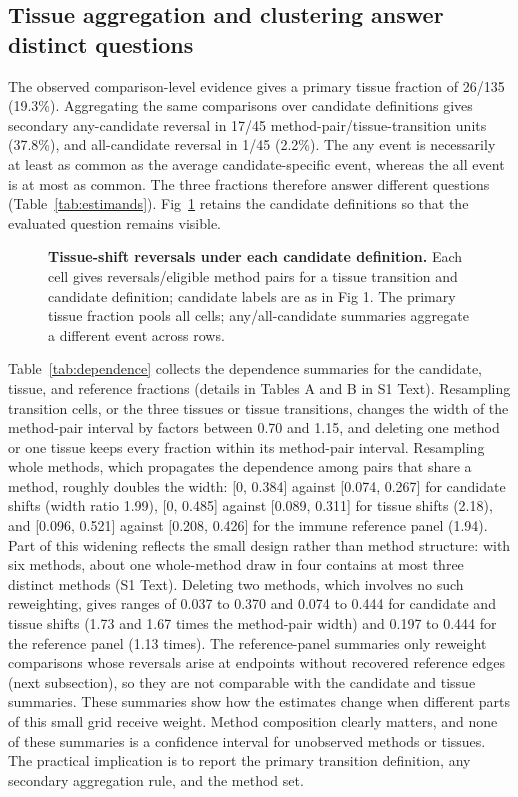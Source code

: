 \documentclass[10pt,letterpaper]{article}
\begin{document}
\subsection*{Tissue aggregation and clustering answer distinct questions}
The observed comparison-level evidence gives a primary tissue fraction of 26/135 (19.3\%). Aggregating the same comparisons over candidate definitions gives secondary any-candidate reversal in 17/45 method-pair/tissue-transition units (37.8\%), and all-candidate reversal in 1/45 (2.2\%). The any event is necessarily at least as common as the average candidate-specific event, whereas the all event is at most as common. The three fractions therefore answer different questions (Table~\ref{tab:estimands}). Fig~\ref{fig:tissue} retains the candidate definitions so that the evaluated question remains visible.

\begin{figure}[!ht]
\caption{{\bf Tissue-shift reversals under each candidate definition.} Each cell gives reversals/eligible method pairs for a tissue transition and candidate definition; candidate labels are as in Fig 1. The primary tissue fraction pools all cells; any/all-candidate summaries aggregate a different event across rows.}
\label{fig:tissue}
\end{figure}

Table~\ref{tab:dependence} collects the dependence summaries for the candidate, tissue, and reference fractions (details in Tables A and B in S1 Text). Resampling transition cells, or the three tissues or tissue transitions, changes the width of the method-pair interval by factors between 0.70 and 1.15, and deleting one method or one tissue keeps every fraction within its method-pair interval. Resampling whole methods, which propagates the dependence among pairs that share a method, roughly doubles the width: [0, 0.384] against [0.074, 0.267] for candidate shifts (width ratio 1.99), [0, 0.485] against [0.089, 0.311] for tissue shifts (2.18), and [0.096, 0.521] against [0.208, 0.426] for the immune reference panel (1.94). Part of this widening reflects the small design rather than method structure: with six methods, about one whole-method draw in four contains at most three distinct methods (S1 Text). Deleting two methods, which involves no such reweighting, gives ranges of 0.037 to 0.370 and 0.074 to 0.444 for candidate and tissue shifts (1.73 and 1.67 times the method-pair width) and 0.197 to 0.444 for the reference panel (1.13 times). The reference-panel summaries only reweight comparisons whose reversals arise at endpoints without recovered reference edges (next subsection), so they are not comparable with the candidate and tissue summaries. These summaries show how the estimates change when different parts of this small grid receive weight. Method composition clearly matters, and none of these summaries is a confidence interval for unobserved methods or tissues. The practical implication is to report the primary transition definition, any secondary aggregation rule, and the method set.
\end{document}
